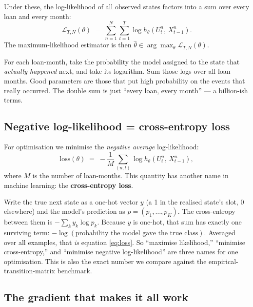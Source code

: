 \documentclass[11pt]{article}
\begin{document}
Under these, the log-likelihood of all observed states factors into a sum over every
loan and every month:
\begin{equation}
  \mathcal{L}_{T,N}(\theta)
  \;=\; \sum_{n=1}^{N}\sum_{t=1}^{T} \log h_\theta\!\left(U^n_t,\, X^n_{t-1}\right).
  \label{eq:loglik}
\end{equation}
The maximum-likelihood estimator is then $\hat\theta \in \arg\max_\theta
\mathcal{L}_{T,N}(\theta)$.

\begin{derivation}
For each loan-month, take the probability the model assigned to the state that \emph{actually
happened} next, and take its logarithm. Sum those logs over all loan-months. Good parameters
are those that put high probability on the events that really occurred. The double sum is
just ``every loan, every month'' --- a billion-ish terms.
\end{derivation}

\subsection{Negative log-likelihood = cross-entropy loss}

For optimisation we minimise the \emph{negative average} log-likelihood:
\begin{equation}
  \text{loss}(\theta)
  \;=\; -\frac{1}{M}\sum_{(n,t)} \log h_\theta\!\left(U^n_t,\, X^n_{t-1}\right),
  \label{eq:loss}
\end{equation}
where $M$ is the number of loan-months. This quantity has another name in machine learning:
the \textbf{cross-entropy loss}.

\begin{intuition}
Write the true next state as a one-hot vector $y$ (a 1 in the realised state's slot, 0
elsewhere) and the model's prediction as $p = (p_1,\dots,p_K)$. The cross-entropy between
them is $-\sum_k y_k \log p_k$. Because $y$ is one-hot, that sum has exactly one surviving
term: $-\log(\text{probability the model gave the true class})$. Averaged over all examples,
that \emph{is} equation \eqref{eq:loss}. So ``maximise likelihood,'' ``minimise
cross-entropy,'' and ``minimise negative log-likelihood'' are three names for one
optimisation. This is also the exact number we compare against the empirical-transition-matrix
benchmark.
\end{intuition}

\subsection{The gradient that makes it all work}
\end{document}
